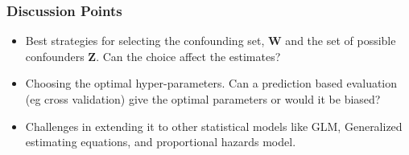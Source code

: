 \documentclass{beamer}
\begin{document}
\begin{frame}
	\frametitle{Discussion Points}
	\begin{itemize}
		\item Best strategies for selecting the confounding set, $
			\bm{W} $ and the set of possible confounders $ \bm{Z}
			$. Can the choice affect the estimates?
		\item Choosing the optimal hyper-parameters. Can a prediction based
			evaluation (eg cross validation) give the optimal parameters
			or would it be biased?
		\item Challenges in extending it to other statistical models
			like GLM, Generalized estimating equations, and
			proportional hazards model.
	\end{itemize}
\end{frame}
\end{document}
